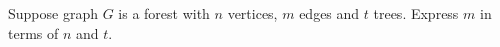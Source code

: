 Suppose graph $G$ is a forest with $n$ vertices, $m$ edges and $t$
trees.  Express $m$ in terms of $n$ and $t$.
